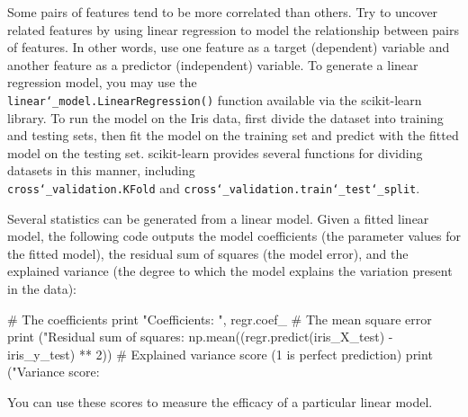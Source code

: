\documentclass[paper=a4, fontsize=11pt]{scrartcl} %
\numberwithin{equation}{section} %
\numberwithin{figure}{section} %
\numberwithin{table}{section} %
\begin{document}
\vspace{6pt}

Some pairs of features tend to be more correlated than others. Try to uncover related features by using linear regression to model the relationship between pairs of features. In other words, use one feature as a target (dependent) variable and another feature as a predictor (independent) variable. To generate a linear regression model, you may use the \\ \texttt{linear\char`_model.LinearRegression()} function available via the scikit-learn library. To run the model on the Iris data, first divide the dataset into training and testing sets, then fit the model on the training set and predict with the fitted model on the testing set. scikit-learn provides several functions for dividing datasets in this manner, including \\ \texttt{cross\char`_validation.KFold} and \texttt{cross\char`_validation.train\char`_test\char`_split}.

\vspace{6pt}

Several statistics can be generated from a linear model. Given a fitted linear model, the following code outputs the model coefficients (the parameter values for the fitted model), the residual sum of squares (the model error), and the explained variance (the degree to which the model explains the variation present in the data):

\vspace{6pt}

\begin{adjustbox}{minipage=0.8\textwidth,margin=0pt \smallskipamount,center}
\begin{python}
# The coefficients
print "Coefficients: \n", regr.coef_
# The mean square error
print ("Residual sum of squares: %
        np.mean((regr.predict(iris_X_test) - iris_y_test) ** 2))
# Explained variance score (1 is perfect prediction)
print ("Variance score: %
\end{python}
\end{adjustbox}

\vspace{6pt}

You can use these scores to measure the efficacy of a particular linear model.

\vspace{8pt}
\end{document}
